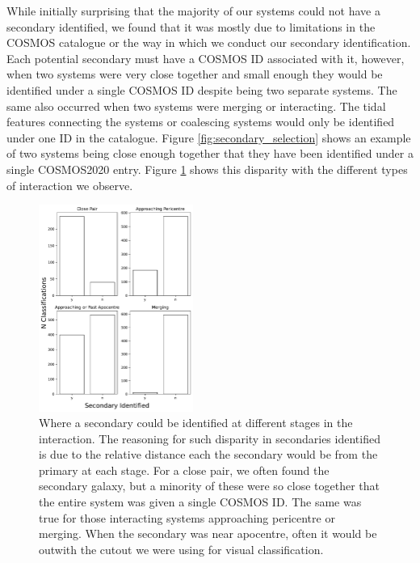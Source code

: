 While initially surprising that the majority of our systems could not have a secondary identified, we found that it was mostly due to limitations in the COSMOS catalogue or the way in which we conduct our secondary identification. Each potential secondary must have a COSMOS ID associated with it, however, when two systems were very close together and small enough they would be identified under a single COSMOS ID despite being two separate systems. The same also occurred when two systems were merging or interacting. The tidal features connecting the systems or coalescing systems would only be identified under one ID in the catalogue. Figure \ref{fig:secondary_selection} shows an example of two systems being close enough together that they have been identified under a single COSMOS2020 entry. Figure \ref{fig:secondaries_found} shows this disparity with the different types of interaction we observe.

\begin{figure}
    \centering
    \includegraphics[width=0.45\textwidth]{Chapter3/figures/visualisation_classification.pdf}
    \caption{Where a secondary could be identified at different stages in the interaction. The reasoning for such disparity in secondaries identified is due to the relative distance each the secondary would be from the primary at each stage. For a close pair, we often found the secondary galaxy, but a minority of these were so close together that the entire system was given a single COSMOS ID. The same was true for those interacting systems approaching pericentre or merging. When the secondary was near apocentre, often it would be outwith the cutout we were using for visual classification.}
    \label{fig:secondaries_found}
\end{figure}

